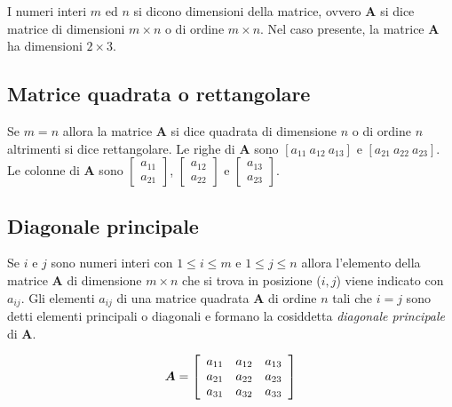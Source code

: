 \documentclass[
  11pt,
]{krantz}
\theoremstyle{definition}
\theoremstyle{definition}
\theoremstyle{definition}
\theoremstyle{definition}
\theoremstyle{remark}
\begin{document}
I numeri interi \(m\) ed \(n\) si dicono dimensioni della matrice, ovvero \(\boldsymbol{A}\) si dice matrice di dimensioni \(m \times n\) o di ordine \(m \times n\). Nel caso presente, la matrice \(\boldsymbol{A}\) ha dimensioni \(2 \times 3\).

\hypertarget{matrice-quadrata-o-rettangolare}{%
\subsection{Matrice quadrata o rettangolare}\label{matrice-quadrata-o-rettangolare}}

Se \(m = n\) allora la matrice \(\boldsymbol{A}\) si dice quadrata di dimensione \(n\) o di ordine \(n\) altrimenti si dice rettangolare. Le righe di \(\boldsymbol{A}\) sono \([a_{11}\
a_{12}\ a_{13}]\) e \([a_{21}\ a_{22}\ a_{23}]\). Le colonne di \(\boldsymbol{A}\) sono \(\left[ \begin{array}{c} a_{11} \\ a_{21} \end{array} \right]\), \(\left[ \begin{array}{c} a_{12} \\ a_{22} \end{array} \right]\) e \(\left[ \begin{array}{c} a_{13} \\ a_{23} \end{array} \right]\).

\hypertarget{diagonale-principale}{%
\subsection{Diagonale principale}\label{diagonale-principale}}

Se \(i\) e \(j\) sono numeri interi con \(1 \leq i \leq m\) e \(1 \leq j \leq n\) allora l'elemento della matrice \(\boldsymbol{A}\) di dimensione \(m \times n\) che si trova in posizione (\(i, j\)) viene indicato con \(a_{ij}\). Gli elementi \(a_{ij}\) di una matrice quadrata \(\boldsymbol{A}\) di ordine \(n\) tali che \(i = j\) sono detti elementi principali o diagonali e formano la cosiddetta \emph{diagonale principale} di \(\boldsymbol{A}\).

\[\boldsymbol{A} =  \left[ \begin{array}{c c c}
a_{11} & a_{12} & a_{13}\\
a_{21} &  a_{22} & a_{23}\\
a_{31} & a_{32} & a_{33} \end{array} \right]\]
\end{document}
